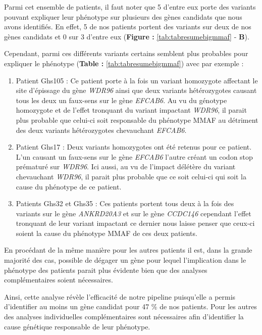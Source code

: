 \documentclass[12pt,twoside]{reedthesis}
\providecommand{\tightlist}{%
  \setlength{\itemsep}{0pt}\setlength{\parskip}{0pt}}
\theoremstyle{definition}
\theoremstyle{definition}
\theoremstyle{remark}
\begin{document}
  Parmi cet ensemble de patients, il faut noter que 5 d'entre eux porte
  des variants pouvant expliquer leur phénotype sur plusieurs des gènes
  candidats que nous avons identifiés. En effet, 5 de nos patients portent
  des variants sur deux de nos gènes candidats et 0 sur 3 d'entre eux
  (\textbf{Figure : }\ref{tab:tabresumebigmmaf} - \textbf{B}).
  
  Cependant, parmi ces différents variants certains semblent plus
  probables pour expliquer le phénotype (\textbf{Table :
  }\ref{tab:tabresumebigmmaf}) avec par exemple :
  
  \begin{enumerate}
  \def\labelenumi{\arabic{enumi}.}
  \tightlist
  \item
    Patient Ghs105 : Ce patient porte à la fois un variant homozygote
    affectant le site d'épissage du gène \emph{WDR96} ainsi que deux
    variants hétérozygotes causant tous les deux un faux-sens sur le gène
    \emph{EFCAB6}. Au vu du génotype homozygote et de l'effet tronquant du
    variant impactant \emph{WDR96}, il parait plus probable que celui-ci
    soit responsable du phénotype MMAF au détriment des deux variants
    hétérozygotes chevauchant \emph{EFCAB6}.\\
  \item
    Patient Ghs17 : Deux variants homozygotes ont été retenus pour ce
    patient. L'un causant un faux-sens sur le gène \emph{EFCAB6} l'autre
    créant un codon stop prématuré sur \emph{WDR96}. Ici aussi, au vu de
    l'impact délétère du variant chevauchant \emph{WDR96}, il parait plus
    probable que ce soit celui-ci qui soit la cause du phénotype de ce
    patient.\\
  \item
    Patients Ghs32 et Ghs35 : Ces patients portent tous deux à la fois des
    variants sur le gène \emph{ANKRD20A3} et sur le gène \emph{CCDC146}
    cependant l'effet tronquant de leur variant impactant ce dernier nous
    laisse penser que ceux-ci soient la cause du phénotype MMAF de ces
    deux patients.
  \end{enumerate}
  
  En procédant de la même manière pour les autres patients il est, dans la
  grande majorité des cas, possible de dégager un gène pour lequel
  l'implication dans le phénotype des patients parait plus évidente bien
  que des analyses complémentaires soient nécessaires.
  
  Ainsi, cette analyse révèle l'efficacité de notre pipeline puisqu'elle a
  permis d'identifier au moins un gène candidat pour 47 \% de nos
  patients. Pour les autres des analyses individuelles complémentaires
  sont nécessaires afin d'identifier la cause génétique responsable de
  leur phénotype.
  
\end{document}
